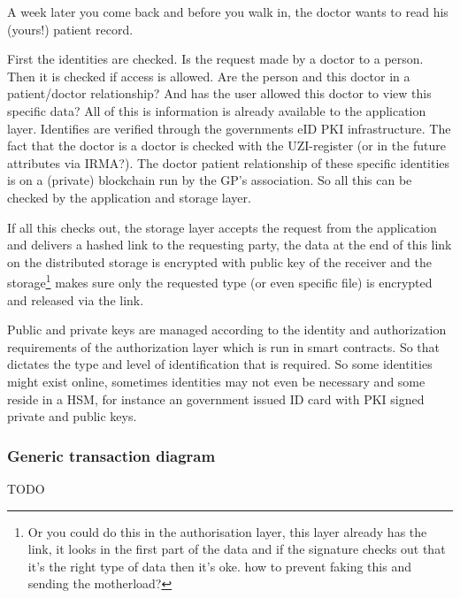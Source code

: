 \documentclass{article}
\begin{document}
A week later you come back and before you walk in, the doctor wants to read his (yours!) patient record.

First the identities are checked. Is the request made by a doctor to a person. Then it is checked if access is allowed. Are the person and this doctor in a patient/doctor relationship? And has the user allowed this doctor to view this specific data? All of this is information is already available to the application layer. Identifies are verified through the governments eID PKI infrastructure. The fact that the doctor is a doctor is checked with the UZI-register (or in the future attributes via IRMA?). The doctor patient relationship of these specific identities is on a (private) blockchain run by the GP's association. So all this can be checked by the application and storage layer.

If all this checks out, the storage layer accepts the request from the application and delivers a hashed link to the requesting party, the data at the end of this link on the distributed storage is encrypted with public key of the receiver and the storage\footnote{Or you could do this in the authorisation layer, this layer already has the link, it looks in the first part of the data and if the signature checks out that it's the right type of data then it's oke. how to prevent faking this and sending the motherload?} makes sure only the requested type (or even specific file) is encrypted and released via the link.

Public and private keys are managed according to the identity and authorization requirements of the authorization layer which is run in smart contracts. So that dictates the type and level of identification that is required. So some identities might exist online, sometimes identities may not even be necessary and some reside in a HSM, for instance an government issued ID card with PKI signed private and public keys. 


\subsubsection{Generic transaction diagram}
TODO
\end{document}
